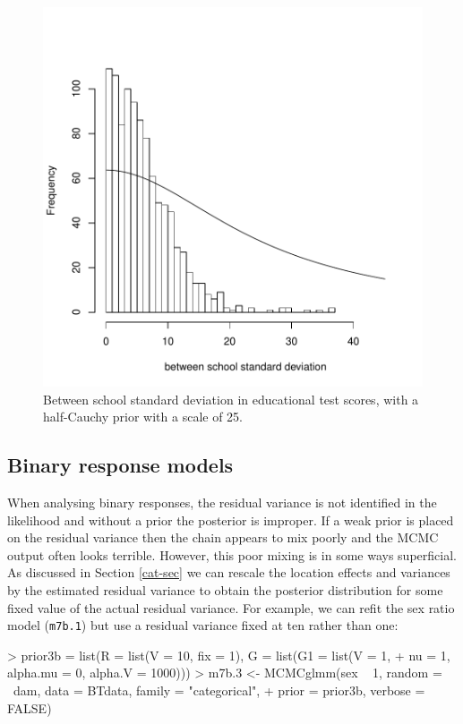 \documentclass{article}
\begin{document}
\begin{figure}[!h]
\begin{center}
\includegraphics{Lecture8-017}
\end{center}
\caption{Between school standard deviation in educational test scores, with a half-Cauchy prior with a scale of 25.}
\label{school3-fig}
\end{figure}

\subsection{Binary response models}

When analysing binary responses, the residual variance is not identified in the likelihood and without a prior the posterior is improper.  If a weak prior is placed on the residual variance then the chain appears to mix poorly and the MCMC output often looks terrible. However, this poor mixing is in some ways superficial. As discussed in Section \ref{cat-sec} we can rescale the location effects and variances by the estimated residual variance to obtain the posterior distribution for some fixed value of the actual residual variance. For example, we can refit the sex ratio model (\texttt{m7b.1}) but use a residual variance fixed at ten rather than one:

\begin{Schunk}
\begin{Sinput}
> prior3b = list(R = list(V = 10, fix = 1), G = list(G1 = list(V = 1, 
+     nu = 1, alpha.mu = 0, alpha.V = 1000)))
> m7b.3 <- MCMCglmm(sex ~ 1, random = ~dam, data = BTdata, family = "categorical", 
+     prior = prior3b, verbose = FALSE)
\end{Sinput}
\end{Schunk}
\end{document}
